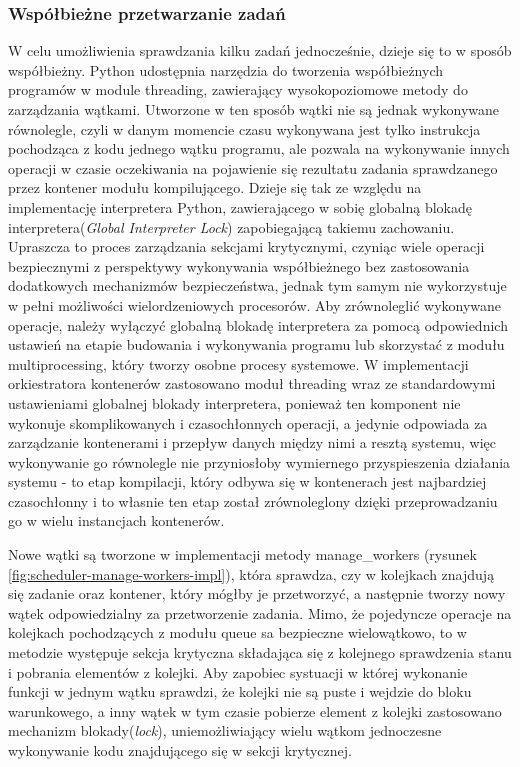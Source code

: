 \subsubsection{Współbieżne przetwarzanie zadań}
W celu umożliwienia sprawdzania kilku zadań jednocześnie, dzieje się to w sposób współbieżny. Python udostępnia narzędzia do tworzenia współbieżnych programów w module threading\cite{pythonThreading}, zawierający wysokopoziomowe metody do zarządzania wątkami. Utworzone w ten sposób wątki nie są jednak wykonywane równolegle, czyli w danym momencie czasu wykonywana jest tylko instrukcja pochodząca z kodu jednego wątku programu, ale pozwala na wykonywanie innych operacji w czasie oczekiwania na pojawienie się rezultatu zadania sprawdzanego przez kontener modułu kompilującego. Dzieje się tak ze względu na implementację interpretera Python, zawierającego w sobię globalną blokadę interpretera(\textit{Global Interpreter Lock}\cite{pythonGlobalInterpreterLock}) zapobiegającą takiemu zachowaniu. Upraszcza to proces zarządzania sekcjami krytycznymi, czyniąc wiele operacji bezpiecznymi z perspektywy wykonywania współbieżnego bez zastosowania dodatkowych mechanizmów bezpieczeństwa, jednak tym samym nie wykorzystuje w pełni możliwości wielordzeniowych procesorów. Aby zrównoleglić wykonywane operacje, należy wyłączyć globalną blokadę interpretera za pomocą odpowiednich ustawień na etapie budowania i wykonywania programu lub skorzystać z modułu multiprocessing\cite{pythonMultiprocessing}, który tworzy osobne procesy systemowe. W implementacji orkiestratora kontenerów zastosowano moduł threading wraz ze standardowymi ustawieniami globalnej blokady interpretera, ponieważ ten komponent nie wykonuje skomplikowanych i czasochłonnych operacji, a jedynie odpowiada za zarządzanie kontenerami i przepływ danych między nimi a resztą systemu, więc wykonywanie go równolegle nie przyniosłoby wymiernego przyspieszenia działania systemu - to etap kompilacji, który odbywa się w kontenerach jest najbardziej czasochłonny i to własnie ten etap został zrównoleglony dzięki przeprowadzaniu go w wielu instancjach kontenerów.

Nowe wątki są tworzone w implementacji metody manage\_workers (rysunek \ref{fig:scheduler-manage-workers-impl}), która sprawdza, czy w kolejkach znajdują się zadanie oraz kontener, który mógłby je przetworzyć, a następnie tworzy nowy wątek odpowiedzialny za przetworzenie zadania. Mimo, że pojedyncze operacje na kolejkach pochodzących z modułu queue\cite{pythonQueue} sa bezpieczne wielowątkowo, to w metodzie występuje sekcja krytyczna składająca się z kolejnego sprawdzenia stanu i pobrania elementów z kolejki. Aby zapobiec systuacji w której wykonanie funkcji w jednym wątku sprawdzi, że kolejki nie są puste i wejdzie do bloku warunkowego, a inny wątek w tym czasie pobierze element z kolejki zastosowano mechanizm blokady(\textit{lock}), uniemożliwiający wielu wątkom jednoczesne wykonywanie kodu znajdującego się w sekcji krytycznej. 

